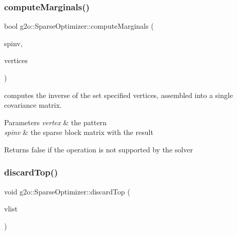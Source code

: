 \subsubsection{\texorpdfstring{compute\+Marginals()}{computeMarginals()}\hspace{0.1cm}{\footnotesize\ttfamily [3/3]}}
{\footnotesize\ttfamily bool g2o\+::\+Sparse\+Optimizer\+::compute\+Marginals (\begin{DoxyParamCaption}\item[{\mbox{\hyperlink{classg2o_1_1_sparse_block_matrix}{Sparse\+Block\+Matrix}}$<$ Matrix\+Xd $>$ \&}]{spinv,  }\item[{const \mbox{\hyperlink{structg2o_1_1_optimizable_graph_a54f01b9b6071e65e6abeebe4afb29dec}{Vertex\+Container}} \&}]{vertices }\end{DoxyParamCaption})\hspace{0.3cm}{\ttfamily [inline]}}

computes the inverse of the set specified vertices, assembled into a single covariance matrix. 
\begin{DoxyParams}{Parameters}
{\em vertex} & the pattern \\
\hline
{\em spinv} & the sparse block matrix with the result \\
\hline
\end{DoxyParams}
\begin{DoxyReturn}{Returns}
false if the operation is not supported by the solver 
\end{DoxyReturn}
\mbox{\label{classg2o_1_1_sparse_optimizer_ac6344493dc9f66d5443759ff9f2abf6c}} 
\subsubsection{\texorpdfstring{discard\+Top()}{discardTop()}\hspace{0.1cm}{\footnotesize\ttfamily [1/4]}}
{\footnotesize\ttfamily void g2o\+::\+Sparse\+Optimizer\+::discard\+Top (\begin{DoxyParamCaption}\item[{\mbox{\hyperlink{classg2o_1_1_hyper_graph_a9339534c99300a0ddac87ba976ef188c}{Sparse\+Optimizer\+::\+Vertex\+Container}} \&}]{vlist }\end{DoxyParamCaption})}



